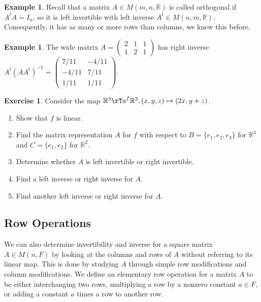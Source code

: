 \documentclass[12pt]{amsart}
\theoremstyle{definition}
\newtheorem{example}[theorem]{Example}
\newtheorem{exercise}[theorem]{Exercise}
\begin{document}
\begin{example} Recall that a matrix $A \in M(m, n, \mathbb{R})$ is called orthogonal if $A^tA = I_n$, so it is left invertible with left inverse $A^t \in M(n, m, \mathbb{R})$. Consequently, it has as many or more rows than columns, we knew this before.
\end{example}

\begin{example}\label{rightinvertible} The wide matrix $A = \left(\begin{array}{ccc} 2 & 1 & 1 \\ 1 & 2 & 1 \end{array}\right)$ has right inverse $A^t(AA^t)^{-1} = \left(\begin{array}{cc} 7/11 & -4/11 \\ -4/11 & 7/11 \\ 1/11 & 1/11 \end{array}\right)$.
\end{example}

\begin{exercise}\label{} Consider the map $\mathbb{R}^3 \rTo^f \mathbb{R}^2, (x, y, z) \mapsto (2x, y+ z)$.
\begin{enumerate}[\indent a.]
\item Show that $f$ is linear.
\item Find the matrix representation $A$ for $f$ with respect to $B = \{e_1, e_2, e_3\}$ for $\mathbb{R}^3$ and $C = \{e_1, e_2\}$ for $\mathbb{R}^2$.
\item Determine whether $A$ is left invertible or right invertible.
\item Find a left inverse or right inverse for $A$.
\item Find another left inverse or right inverse for $A$.
\end{enumerate}
\end{exercise}

\subsection{Row Operations} We can also determine invertibility and inverse for a square matrix $A \in M(n, F)$ by looking at the columns and rows of $A$ without referring to its linear map. This is done by studying $A$ through simple row modifications and column modifications.
\dfn We define an elementary row operation for a matrix $A$ to be either interchanging two rows, multiplying a row by a nonzero constant $a \in F$, or adding a constant $a$ times a row to another row.
\end{document}
